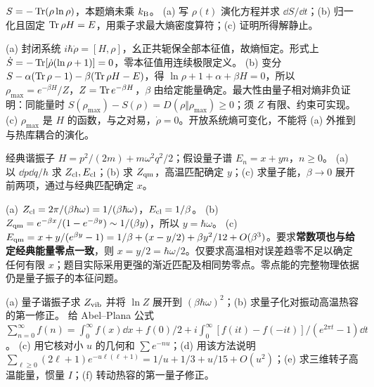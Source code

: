 \begin{exercise}
$S=-\operatorname{Tr}(\rho\ln\rho)$，本题熵未乘 $k_{\mathrm B}$。
(a) 写 $\rho(t)$ 演化方程并求 $\dd S/\dd t$；(b) 归一化且固定 $\operatorname{Tr}\rho H=E$，用乘子求最大熵密度算符；(c) 证明所得解静止。
\end{exercise}
\begin{solution}
(a) 封闭系统 $i\hbar\dot\rho=[H,\rho]$，幺正共轭保全部本征值，故熵恒定。形式上 $\dot S=-\operatorname{Tr}[\dot\rho(\ln\rho+1)]=0$，零本征值用连续极限定义。
(b) 变分 $S-\alpha(\operatorname{Tr}\rho-1)-\beta(\operatorname{Tr}\rho H-E)$，得 $\ln\rho+1+\alpha+\beta H=0$，所以 $\rho_{\max}=e^{-\beta H}/Z$，$Z=\operatorname{Tr} e^{-\beta H}$，$\beta$ 由给定能量确定。最大性由量子相对熵非负证明：同能量时 $S(\rho_{\max})-S(\rho)=D(\rho\Vert\rho_{\max})\ge0$；须 $Z$ 有限、约束可实现。
(c) $\rho_{\max}$ 是 $H$ 的函数，与之对易，$\dot\rho=0$。开放系统熵可变化，不能将 (a) 外推到与热库耦合的演化。
\end{solution}
\begin{exercise}
经典谐振子 $H=p^2/(2m)+m\omega^2q^2/2$；假设量子谱 $E_n=x+yn$，$n\ge0$。
(a) 以 $\dd p\dd q/h$ 求 $Z_{\rm cl},E_{\rm cl}$；(b) 求 $Z_{\rm qm}$，高温匹配确定 $y$；(c) 求量子能，$\beta\to0$ 展开前两项，通过与经典匹配确定 $x$。
\end{exercise}
\begin{solution}
(a) $Z_{\rm cl}=2\pi/(\beta h\omega)=1/(\beta\hbar\omega)$，$E_{\rm cl}=1/\beta$。
(b) $Z_{\rm qm}=e^{-\beta x}/(1-e^{-\beta y})\sim1/(\beta y)$，所以 $y=\hbar\omega$。
(c) $E_{\rm qm}=x+y/(e^{\beta y}-1)=1/\beta+(x-y/2)+\beta y^2/12+O(\beta^3)$。要求\textbf{常数项也与给定经典能量零点一致}，则 $x=y/2=\hbar\omega/2$。仅要求高温相对误差趋零不足以确定任何有限 $x$；题目实际采用更强的渐近匹配及相同势零点。零点能的完整物理依据仍是量子振子的本征问题。
\end{solution}
\begin{exercise}
(a) 量子谐振子求 $Z_{\rm vib}$ 并将 $\ln Z$ 展开到 $(\beta\hbar\omega)^2$；(b) 求量子化对振动高温热容的第一修正。
给 Abel--Plana 公式 $\sum_{n=0}^\infty f(n)=\int_0^\infty f(x)\dd x+f(0)/2+i\int_0^\infty[f(it)-f(-it)]/(e^{2\pi t}-1)\dd t$。
(c) 用它核对小 $u$ 的几何和 $\sum e^{-nu}$；(d) 用该方法说明 $\sum_{\ell\ge0}(2\ell+1)e^{-u\ell(\ell+1)}=1/u+1/3+u/15+O(u^2)$；(e) 求三维转子高温能量，惯量 $I$；(f) 转动热容的第一量子修正。
\end{exercise}
